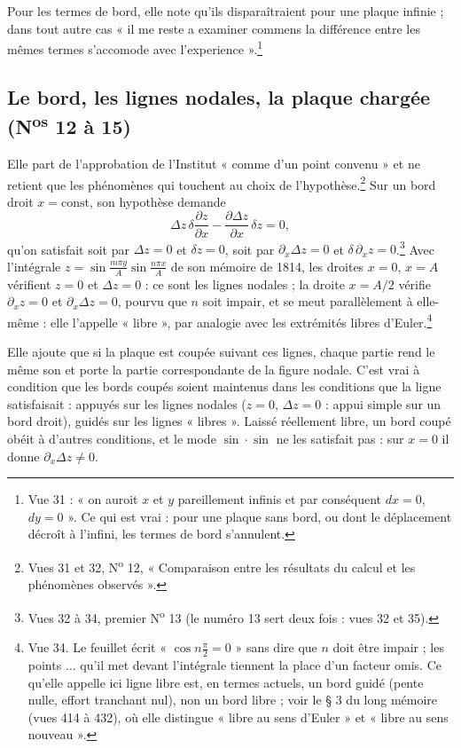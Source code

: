 \documentclass[11pt,a4paper]{article}
\begin{document}
Pour les termes de bord, elle note qu'ils disparaîtraient pour une plaque
infinie ; dans tout autre cas « il me reste a examiner commens la différence
entre les mêmes termes s'accomode avec l'experience ».\footnote{Vue 31 : « on
auroit $x$ et $y$ pareillement infinis et par conséquent $dx = 0$, $dy = 0$ ».
Ce qui est vrai : pour une plaque sans bord, ou dont le déplacement décroît à
l'infini, les termes de bord s'annulent.}

\subsection*{Le bord, les lignes nodales, la plaque chargée (N\textsuperscript{os} 12 à 15)}

Elle part de l'approbation de l'Institut « comme d'un point convenu » et ne
retient que les phénomènes qui touchent au choix de l'hypothèse.\footnote{Vues
31 et 32, N\textsuperscript{o} 12, « Comparaison entre les résultats du calcul et
les phénomènes observés ».} Sur un bord droit $x = \mathrm{const}$, son
hypothèse demande
\[
\Delta z\,\delta\frac{\partial z}{\partial x} - \frac{\partial\Delta z}{\partial
x}\,\delta z = 0 ,
\]
qu'on satisfait soit par $\Delta z = 0$ et $\delta z = 0$, soit par $\partial_x
\Delta z = 0$ et $\delta\,\partial_x z = 0$.\footnote{Vues 32 à 34, premier
N\textsuperscript{o} 13 (le numéro 13 sert deux fois : vues 32 et 35).} Avec
l'intégrale $z = \sin\frac{m\pi y}{A}\sin\frac{n\pi x}{A}$ de son mémoire de
1814, les droites $x = 0$, $x = A$ vérifient $z = 0$ et $\Delta z = 0$ : ce sont
les lignes nodales ; la droite $x = A/2$ vérifie $\partial_x z = 0$ et
$\partial_x\Delta z = 0$, pourvu que $n$ soit impair, et se meut parallèlement à
elle-même : elle l'appelle « libre », par analogie avec les extrémités libres
d'Euler.\footnote{Vue 34. Le feuillet écrit « $\cos n\frac\pi2 = 0$ » sans dire
que $n$ doit être impair ; les points $\ldots$ qu'il met devant l'intégrale
tiennent la place d'un facteur omis. Ce qu'elle appelle ici ligne libre est, en termes
actuels, un bord guidé (pente nulle, effort tranchant nul), non un bord libre ;
voir le § 3 du long mémoire (vues 414 à 432), où elle distingue « libre au sens d'Euler » et « libre au sens nouveau ».}

Elle ajoute que si la plaque est coupée suivant ces lignes, chaque partie rend
le même son et porte la partie correspondante de la figure nodale. C'est vrai à
condition que les bords coupés soient maintenus dans les conditions que la
ligne satisfaisait : appuyés sur les lignes nodales ($z = 0$, $\Delta z = 0$ :
appui simple sur un bord droit), guidés sur les lignes « libres ». Laissé
réellement libre, un bord coupé obéit à d'autres conditions, et le mode
$\sin\cdot\sin$ ne les satisfait pas : sur $x = 0$ il donne $\partial_x\Delta z
\neq 0$.
\end{document}
